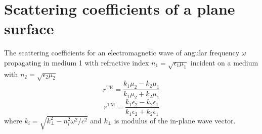 \section{Scattering coefficients of a plane surface}
The scattering coefficients for an electromagnetic wave of angular frequency $\omega$ propagating in medium 1 with refractive index $n_1=\sqrt{\epsilon_1\mu_1}$ incident on a medium with $n_2 = \sqrt{\epsilon_2\mu_2}$ 
\begin{equation}
r^\text{TE}=\frac{k_1 \mu_2 - k_2 \mu_1}{k_1 \mu_2 + k_2 \mu_1}
\label{eqn:FresnelTE}
\end{equation}
\begin{equation}
r^\text{TM}=\frac{k_1 \epsilon_2 - k_2 \epsilon_1}{k_1 \epsilon_2 + k_2 \epsilon_1}
\label{eqn:FresnelTM}
\end{equation}
where $k_i = \sqrt{k_\perp^2 - n_i^2\omega^2/c^2}$ and $k_\perp$ is modulus of the in-plane wave vector.
